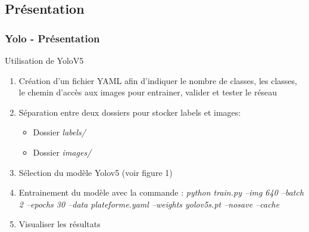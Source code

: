 \documentclass[12pt]{beamer}
\begin{document}
	\subsection{Présentation}
	\begin{frame}[allowframebreaks]
	\frametitle{Yolo - Présentation}
	    \begin{block}{Utilisation de YoloV5}
	        \begin{enumerate}
	            [triangle]
	            \item Création d'un fichier YAML afin d'indiquer le nombre de classes, les classes, le chemin d'accès aux images pour entrainer, valider et tester le réseau
	            \item Séparation entre deux dossiers pour stocker labels et images:
	                \begin{itemize}
	                    \item Dossier \textit{labels/}
	                    \item Dossier \textit{images/}
	                \end{itemize}
	            \item Sélection du modèle Yolov5 (voir figure 1)
	            \item Entrainement du modèle avec la commande : \textit{python train.py --img 640 --batch 2 --epochs 30 --data plateforme.yaml --weights yolov5s.pt --nosave --cache}
	            \item Visualiser les résultats
	        \end{enumerate}
	    \end{block}
    \end{frame}
\end{document}
